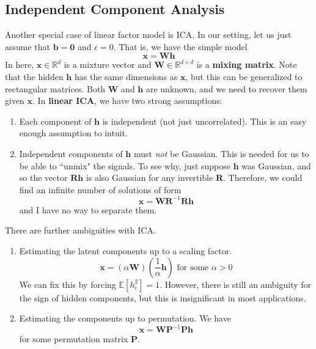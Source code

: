 \documentclass{article}
\theoremstyle{definition}
\theoremstyle{remark}
\theoremstyle{definition}
\begin{document}
      \subsection{Independent Component Analysis} 

        Another special case of linear factor model is ICA. In our setting, let us just assume that $\mathbf{b} = \mathbf{0}$ and $\epsilon = 0$. That is, we have the simple model 
        \[\mathbf{x} = \mathbf{W} \mathbf{h}\] 
        In here, $\mathbf{x} \in \mathbb{R}^d$ is a mixture vector and $\mathbf{W} \in \mathbb{R}^{d \times d}$ is a \textbf{mixing matrix}. Note that the hidden $\mathbf{h}$ has the same dimensions as $\mathbf{x}$, but this can be generalized to rectangular matrices. Both $\mathbf{W}$ and $\mathbf{h}$ are unknown, and we need to recover them given $\mathbf{x}$. In \textbf{linear ICA}, we have two strong assumptions: 
        \begin{enumerate} 
            \item Each component of $\mathbf{h}$ is independent (not just uncorrelated). This is an easy enough assumption to intuit.  
            \item Independent components of $\mathbf{h}$ must \textit{not} be Gaussian. This is needed for us to be able to ``unmix" the signals. To see why, just suppose $\mathbf{h}$ was Gaussian, and so the vector $\mathbf{R} \mathbf{h}$ is also Gaussian for any invertible $\mathbf{R}$. Therefore, we could find an infinite number of solutions of form 
            \[\mathbf{x} = \mathbf{W} \mathbf{R}^{-1} \mathbf{R} \mathbf{h}\]
            and I have no way to separate them. 
        \end{enumerate}

        There are further ambiguities with ICA. 
        \begin{enumerate}
            \item Estimating the latent components up to a scaling factor. 
                \[\mathbf{x} = (\alpha \mathbf{W}) (\frac{1}{\alpha} \mathbf{h}) \text{ for some } \alpha > 0\]
                We can fix this by forcing $\mathbb{E}[h_i^2] = 1$. However, there is still an ambiguity for the sign of hidden components, but this is insignificant in most applications. 

            \item Estimating the components up to permutation. We have 
                \[\mathbf{x} = \mathbf{W} \mathbf{P}^{-1} \mathbf{P} \mathbf{h}\] 
                for some permutation matrix $\mathbf{P}$. 
        \end{enumerate}
\end{document}
